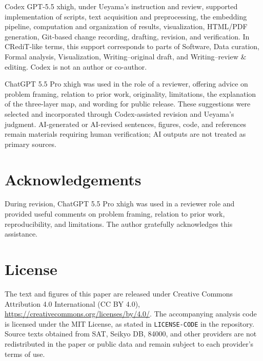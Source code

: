 \documentclass[uplatex,dvipdfmx,11pt,a4paper]{jsarticle}
\begin{document}
Codex GPT-5.5 xhigh, under Ueyama's instruction and review, supported implementation of scripts, text acquisition and preprocessing, the embedding pipeline, computation and organization of results, visualization, HTML/PDF generation, Git-based change recording, drafting, revision, and verification. In CRediT-like terms, this support corresponds to parts of Software, Data curation, Formal analysis, Visualization, Writing--original draft, and Writing--review \& editing. Codex is not an author or co-author.

ChatGPT 5.5 Pro xhigh was used in the role of a reviewer, offering advice on problem framing, relation to prior work, originality, limitations, the explanation of the three-layer map, and wording for public release. These suggestions were selected and incorporated through Codex-assisted revision and Ueyama's judgment. AI-generated or AI-revised sentences, figures, code, and references remain materials requiring human verification; AI outputs are not treated as primary sources.

\section*{Acknowledgements}

During revision, ChatGPT 5.5 Pro xhigh was used in a reviewer role and provided useful comments on problem framing, relation to prior work, reproducibility, and limitations. The author gratefully acknowledges this assistance.

\section*{License}

The text and figures of this paper are released under Creative Commons Attribution 4.0 International (CC BY 4.0), \url{https://creativecommons.org/licenses/by/4.0/}. The accompanying analysis code is licensed under the MIT License, as stated in \texttt{LICENSE-CODE} in the repository. Source texts obtained from SAT, Seikyo DB, 84000, and other providers are not redistributed in the paper or public data and remain subject to each provider's terms of use.
\end{document}
